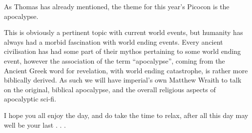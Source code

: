 As Thomas has already mentioned, the theme for this year’s Picocon is the apocalypse.

This is obviously a pertinent topic with current world events, but humanity has always had a morbid fascination with world ending events. Every ancient civilisation has had some part of their mythos pertaining to some world ending event, however the association of the term “apocalypse”, coming from the Ancient Greek word for revelation, with world ending catastrophe, is rather more biblically derived. As such we will have imperial’s own Matthew Wraith to talk on the original, biblical apocalypse, and the overall religious aspects of apocalyptic sci-fi.

I hope you all enjoy the day, and do take the time to relax, after all this day may well be your last . . .
